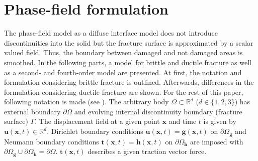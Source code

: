 \section{Phase-field formulation} \label{sec:formul}
The phase-field model as a diffuse interface model does not introduce discontinuities into the solid but the fracture surface is approximated by a scalar valued field. Thus, the boundary between damaged and not damaged areas is smoothed. In the following parts, a model for brittle and ductile fracture as well as a second- and fourth-order model are presented. At first, the notation and formulation considering brittle fracture is outlined. Afterwards, differences in the formulation considering ductile fracture are shown. For the rest of this paper, following notation is made (see ). The arbitrary body $\Omega\subset\mathbb{R}^{d}$ ($d\in\{1,2,3\}$) has external boundary $\partial\Omega$ and evolving internal discontinuity boundary (fracture surface) $\Gamma$. The displacement field at a given point $\mathbf{x}$ and time $t$ is given by $\mathbf{u}\left(\mathbf{x},t\right)\in\mathbb{R}^{d}$. Dirichlet boundary conditions $\mathbf{u}\left(\mathbf{x},t\right)=\mathbf{g}\left(\mathbf{x},t\right)$ on $\partial\Omega_{\mathbf{g}}$ and Neumann boundary conditions $\mathbf{t}\left(\mathbf{x},t\right)=\mathbf{h}\left(\mathbf{x},t\right)$ on $\partial\Omega_{\mathbf{h}}$ are imposed with $\partial\Omega_{\mathbf{g}}\cup\partial\Omega_{\mathbf{h}}=\partial\Omega$. $\mathbf{t}\left(\mathbf{x},t\right)$ describes a given traction vector force.
